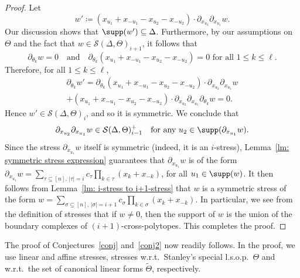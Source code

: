 \begin{proof}
	Let $$w'\coloneqq (x_{u_1}+x_{-u_1}-x_{u_2}-x_{-u_2})\cdot \partial_{x_{u_2}}\partial_{x_{u_1}} w.$$ Our discussion shows that $\supp(w')\subseteq \Delta$. Furthermore, by our assumptions on $\Theta$ and the fact that $w\in \mathcal{S}(\Delta, \Theta)_{i+1}$, it follows that $$\partial_{\theta_k} w=0 \quad \mbox{and} \quad \partial_{\theta_k}(x_{u_1}+x_{-u_1}-x_{u_2}-x_{-u_2})=0 \mbox{ for all $1\leq k\leq \ell$.}$$ Therefore, for all $1\leq k\leq \ell$,
\begin{multline*}
\partial_{\theta_k} w' =
\partial_{\theta_k}(x_{u_1}+x_{-u_1}-x_{u_2}-x_{-u_2}) \cdot \partial_{x_{u_2}}\partial_{x_{u_1}} w \\ 
+(x_{u_1} + x_{-u_1}-x_{u_2}-x_{-u_2}) \cdot\partial_{x_{u_2}}\partial_{x_{u_1}} \partial_{\theta_k}w = 0.
\end{multline*}
	Hence $w'\in \mathcal{S}(\Delta, \Theta)_i$, and so it is symmetric. We conclude that $$\partial_{x_{u_2}}\partial_{x_{u_1}} w\in \mathcal{S}(\Delta, \Theta)^+_{i-1} \quad \mbox{for any $u_2\in \supp(\partial_{x_{u_1}} w)$.}$$ Since the stress $\partial_{x_{u_1}}w$ itself is symmetric (indeed, it is an $i$-stress), Lemma~\ref{lm: symmetric stress expression} guarantees that $\partial_{x_{u_1}}w$ is of the form $\partial_{x_{u_1}} w=\sum_{\tau\subseteq [n], \, |\tau|=i} c_\tau \prod_{k\in \tau} (x_k+x_{-k})$, for all $u_1\in\supp(w)$. It then follows from Lemma~\ref{lm: i-stress to i+1-stress} that $w$ is a symmetric stress of the form $w=\sum_{\sigma\subseteq [n], \, |\sigma|=i+1} c_\sigma \prod_{k\in \sigma} (x_k+x_{-k})$. In particular, we see from the definition of stresses that if $w\neq 0$, then the support of $w$ is the union of the boundary complexes of $(i+1)$-cross-polytopes. This completes the proof.
\end{proof}

The proof of Conjectures~\ref{conj} and~\ref{conj2} now readily follows. In the proof, we use linear and affine stresses, \ie stresses w.r.t.~Stanley's special l.s.o.p.~$\Theta$ and w.r.t.~the set of canonical linear forms $\widetilde{\Theta}$, respectively.

